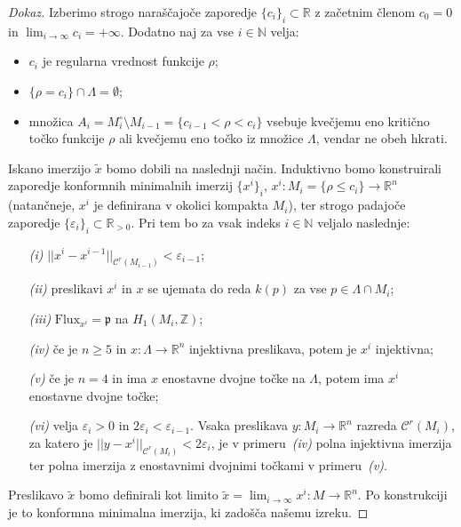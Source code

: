 \documentclass[12pt,a4paper,twoside]{article}
\theoremstyle{definition} %
\newenvironment{dokaz}[1][Dokaz]{\begin{proof}[#1]}{\end{proof}}
\theoremstyle{plain} %
\numberwithin{equation}{section}  %
\newcommand{\Z}{\mathbb Z}
\begin{document}
\begin{dokaz}
Izberimo strogo naraščajoče zaporedje $\{ c_{i} \}_{i} \subset \mathbb{R}$ z začetnim členom $c_0=0 $ in $\lim_{i \to \infty}c_{i} = + \infty$. Dodatno naj za vse $i \in \mathbb{N}$ velja:
\begin{itemize}
\item $c_{i}$ je regularna vrednost funkcije $\rho$;
\item $ \{ \rho = c_{i} \} \cap \Lambda = \emptyset$;
\item množica $A_{i} = M_{i}^{\circ} \setminus M_{i-1} = \{ c_{i-1} < \rho < c_{i} \}$ vsebuje kvečjemu eno kritično točko funkcije $\rho$ ali kvečjemu eno točko iz množice $\Lambda$, vendar ne obeh hkrati.
\end{itemize}
%
Iskano imerzijo $\tilde{x}$ bomo dobili na naslednji način. Induktivno bomo konstruirali zaporedje konformnih minimalnih imerzij $\{ x^{i} \}_{i}$, $x^{i} \colon M_{i} = \{ \rho \leq c_{i} \} \to \mathbb{R}^{n}$ (natančneje, $x^{i}$ je definirana v okolici kompakta $M_{i}$), ter strogo padajoče zaporedje $\{ \varepsilon_{i} \}_{i} \subset \mathbb{R}_{>0}$. Pri tem bo za vsak indeks $i \in \mathbb{N}$ veljalo naslednje:
\begin{itemize}
\item[\textit{(i)}] $||x^{i} - x^{i-1}||_{\mathcal{C}^{r}(M_{i-1})} < \varepsilon_{i-1}$;
\item[\textit{(ii)}] preslikavi $x^{i}$ in $x$ se ujemata do reda $k(p)$ za vse $p \in \Lambda \cap M_{i}$;
\item[\textit{(iii)}] $\text{Flux}_{x^{i}} = \mathfrak{p}$ na $H_{1}(M_{i},\Z)$;
\item[\textit{(iv)}] če je $n \geq 5$ in $x \colon \Lambda \to \mathbb{R}^{n}$ injektivna preslikava, potem je $x^{i}$ injektivna;
\item[\textit{(v)}] če je $n=4$ in ima $x$ enostavne dvojne točke na $\Lambda$, potem ima $x^{i}$ enostavne dvojne točke;
\item[\textit{(vi)}] velja $\varepsilon_{i} > 0$ in $2 \varepsilon_{i} < \varepsilon_{i-1}$.
	Vsaka preslikava $y \colon M_{i} \to \mathbb{R}^{n}$ razreda $\mathcal{C}^{r}(M_{i})$, za katero je 
	$||y-x^{i}||_{\mathcal{C}^{r}(M_{i})} < 2\varepsilon_{i}$, 
	je v primeru~\textit{(iv)} polna injektivna imerzija ter polna imerzija z enostavnimi dvojnimi točkami v primeru~\textit{(v)}.
\end{itemize}
%
Preslikavo $\tilde{x}$ bomo definirali kot limito $\tilde{x} = \lim_{i \to \infty}x^{i} \colon M \to \mathbb{R}^{n}$. Po konstrukciji je to konformna minimalna imerzija, ki zadošča našemu izreku.


\end{dokaz}
\end{document}
